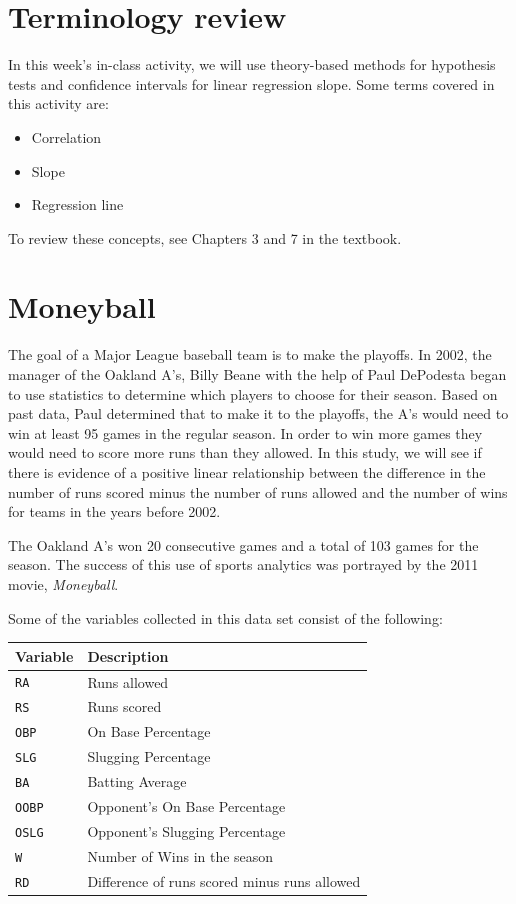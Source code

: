 \documentclass[
]{report}
\begin{document}
\hypertarget{terminology-review}{%
\section{Terminology review}\label{terminology-review}}

In this week's in-class activity, we will use theory-based methods for hypothesis tests and confidence intervals for linear regression slope. Some terms covered in this activity are:

\begin{itemize}
\item
  Correlation
\item
  Slope
\item
  Regression line
\end{itemize}

To review these concepts, see Chapters 3 and 7 in the textbook.

\newpage

\hypertarget{moneyball}{%
\section{Moneyball}\label{moneyball}}

The goal of a Major League baseball team is to make the playoffs. In 2002, the manager of the Oakland A's, Billy Beane with the help of Paul DePodesta began to use statistics to determine which players to choose for their season. Based on past data, Paul determined that to make it to the playoffs, the A's would need to win at least 95 games in the regular season. In order to win more games they would need to score more runs than they allowed. In this study, we will see if there is evidence of a positive linear relationship between the difference in the number of runs scored minus the number of runs allowed and the number of wins for teams in the years before 2002.

The Oakland A's won 20 consecutive games and a total of 103 games for the season. The success of this use of sports analytics was portrayed by the 2011 movie, \emph{Moneyball}.

Some of the variables collected in this data set consist of the following:

\begin{longtable}[]{@{}ll@{}}
\toprule
\textbf{Variable} & \textbf{Description}\tabularnewline
\midrule
\endhead
\texttt{RA} & Runs allowed\tabularnewline
\texttt{RS} & Runs scored\tabularnewline
\texttt{OBP} & On Base Percentage\tabularnewline
\texttt{SLG} & Slugging Percentage\tabularnewline
\texttt{BA} & Batting Average\tabularnewline
\texttt{OOBP} & Opponent's On Base Percentage\tabularnewline
\texttt{OSLG} & Opponent's Slugging Percentage\tabularnewline
\texttt{W} & Number of Wins in the season\tabularnewline
\texttt{RD} & Difference of runs scored minus runs allowed\tabularnewline
\bottomrule
\end{longtable}
\end{document}
